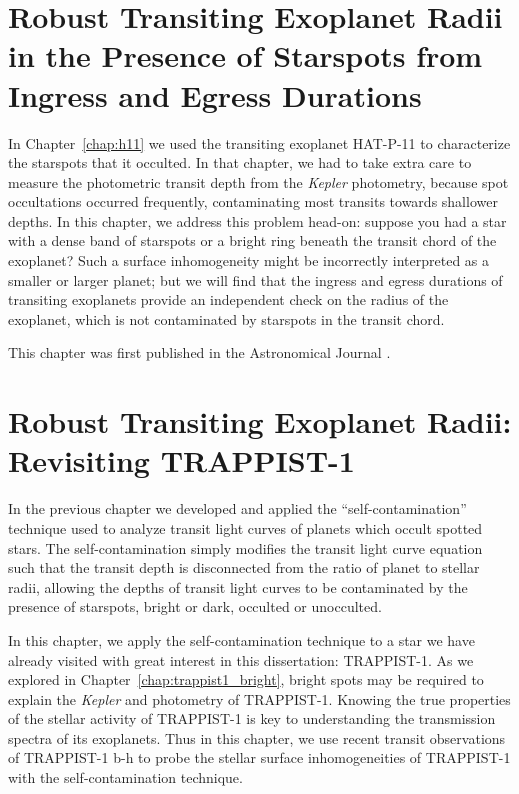\documentclass[12pt, twoside]{uwthesis}
\newcommand{\kepler}{\textsl{Kepler}\xspace}
\begin{document}
\chapter{Robust Transiting Exoplanet Radii in the Presence of Starspots from Ingress and Egress Durations} \label{chapter:robin}

In Chapter~\ref{chap:h11} we used the transiting exoplanet HAT-P-11 to characterize the starspots that it occulted. In that chapter, we had to take extra care to measure the photometric transit depth from the \kepler photometry, because spot occultations occurred frequently, contaminating most transits towards shallower depths. In this chapter, we address this problem head-on: suppose you had a star with a dense band of starspots or a bright ring beneath the transit chord of the exoplanet? Such a surface inhomogeneity might be incorrectly interpreted as a smaller or larger planet; but we will find that the ingress and egress durations of transiting exoplanets provide an independent check on the radius of the exoplanet, which is not contaminated by starspots in the transit chord.    

This chapter was first published in the Astronomical Journal \citep{Morris2018e}.



\chapter{Robust Transiting Exoplanet Radii: Revisiting TRAPPIST-1} \label{chapter:robin_trap}

In the previous chapter we developed and applied the ``self-contamination'' technique used to analyze transit light curves of planets which occult spotted stars. The self-contamination simply modifies the \citet{Mandel2002} transit light curve equation such that the transit depth is disconnected from the ratio of planet to stellar radii, allowing the depths of transit light curves to be contaminated by the presence of starspots, bright or dark, occulted or unocculted. 

In this chapter, we apply the self-contamination technique to a star we have already visited with great interest in this dissertation: TRAPPIST-1. As we explored in Chapter~\ref{chap:trappist1_bright}, bright spots may be required to explain the \kepler and \spitzer photometry of TRAPPIST-1. Knowing the true properties of the stellar activity of TRAPPIST-1 is key to understanding the transmission spectra of its exoplanets. Thus in this chapter, we use recent \spitzer transit observations of TRAPPIST-1 b-h to probe the stellar surface inhomogeneities of TRAPPIST-1 with the self-contamination technique.
\end{document}
